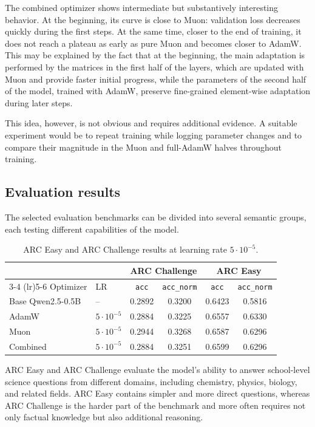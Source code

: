 \documentclass{article}
\begin{document}
The combined optimizer shows intermediate but substantively interesting behavior. At the beginning, its curve is close to Muon: validation loss decreases quickly during the first steps. At the same time, closer to the end of training, it does not reach a plateau as early as pure Muon and becomes closer to AdamW. This may be explained by the fact that at the beginning, the main adaptation is performed by the matrices in the first half of the layers, which are updated with Muon and provide faster initial progress, while the parameters of the second half of the model, trained with AdamW, preserve fine-grained element-wise adaptation during later steps.

This idea, however, is not obvious and requires additional evidence. A suitable experiment would be to repeat training while logging parameter changes and to compare their magnitude in the Muon and full-AdamW halves throughout training.

\subsection{Evaluation results}

The selected evaluation benchmarks can be divided into several semantic groups,
each testing different capabilities of the model.

\begin{table}[ht]
\centering
\begin{tabular}{llcccc}
\toprule
& & \multicolumn{2}{c}{ARC Challenge} & \multicolumn{2}{c}{ARC Easy} \\
\cmidrule(lr){3-4} \cmidrule(lr){5-6}
Optimizer & LR
& \texttt{acc} & \texttt{acc\_norm}
& \texttt{acc} & \texttt{acc\_norm} \\
\midrule
Base Qwen2.5-0.5B & -- & 0.2892 & 0.3200 & 0.6423 & 0.5816 \\
\midrule
AdamW    & $5 \cdot 10^{-5}$ & 0.2884 & 0.3225 & 0.6557 & 0.6330 \\
Muon     & $5 \cdot 10^{-5}$ & 0.2944 & 0.3268 & 0.6587 & 0.6296 \\
Combined & $5 \cdot 10^{-5}$ & 0.2884 & 0.3251 & 0.6599 & 0.6296 \\
\bottomrule
\end{tabular}
\caption{ARC Easy and ARC Challenge results at learning rate $5 \cdot 10^{-5}$.}
\label{tab:arc-results}
\end{table}

ARC Easy and ARC Challenge evaluate the model's ability to answer school-level
science questions from different domains, including chemistry, physics, biology,
and related fields. ARC Easy contains simpler and more direct questions, whereas
ARC Challenge is the harder part of the benchmark and more often requires not
only factual knowledge but also additional reasoning.
\end{document}
